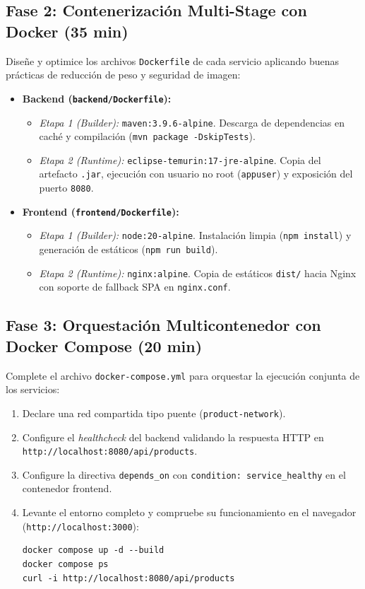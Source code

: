 \documentclass[10pt,letterpaper]{article}
\begin{document}
\subsection{Fase 2: Contenerización Multi-Stage con Docker (35 min)}
Diseñe y optimice los archivos \texttt{Dockerfile} de cada servicio aplicando buenas prácticas de reducción de peso y seguridad de imagen:
\begin{itemize}[leftmargin=*,itemsep=2.5pt,topsep=2pt]
  \item \textbf{Backend (\texttt{backend/Dockerfile}):}
    \begin{itemize}[itemsep=1pt]
      \item \textit{Etapa 1 (Builder):} \texttt{maven:3.9.6-alpine}. Descarga de dependencias en caché y compilación (\texttt{mvn package -DskipTests}).
      \item \textit{Etapa 2 (Runtime):} \texttt{eclipse-temurin:17-jre-alpine}. Copia del artefacto \texttt{.jar}, ejecución con usuario no root (\texttt{appuser}) y exposición del puerto \texttt{8080}.
    \end{itemize}
  \item \textbf{Frontend (\texttt{frontend/Dockerfile}):}
    \begin{itemize}[itemsep=1pt]
      \item \textit{Etapa 1 (Builder):} \texttt{node:20-alpine}. Instalación limpia (\texttt{npm install}) y generación de estáticos (\texttt{npm run build}).
      \item \textit{Etapa 2 (Runtime):} \texttt{nginx:alpine}. Copia de estáticos \texttt{dist/} hacia Nginx con soporte de fallback SPA en \texttt{nginx.conf}.
    \end{itemize}
\end{itemize}

\subsection{Fase 3: Orquestación Multicontenedor con Docker Compose (20 min)}
Complete el archivo \texttt{docker-compose.yml} para orquestar la ejecución conjunta de los servicios:
\begin{enumerate}[leftmargin=*,label=\textbf{\alph*)},itemsep=2pt,topsep=2pt]
  \item Declare una red compartida tipo puente (\texttt{product-network}).
  \item Configure el \textit{healthcheck} del backend validando la respuesta HTTP en \texttt{http://localhost:8080/api/products}.
  \item Configure la directiva \texttt{depends\_on} con \texttt{condition: service\_healthy} en el contenedor frontend.
  \item Levante el entorno completo y compruebe su funcionamiento en el navegador (\texttt{http://localhost:3000}):
  \begin{lstlisting}[style=bashstyle]
docker compose up -d --build
docker compose ps
curl -i http://localhost:8080/api/products
  \end{lstlisting}
\end{enumerate}
\end{document}
